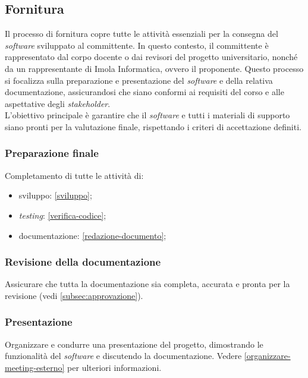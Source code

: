 \subsection{Fornitura}
Il processo di fornitura copre tutte le attività essenziali per la consegna del \textit{software} sviluppato al committente.
In questo contesto, il committente è rappresentato dal corpo docente o dai revisori del progetto universitario, nonché da un rappresentante di Imola Informatica, ovvero il proponente.
Questo processo si focalizza sulla preparazione e presentazione del \textit{software} e della relativa documentazione, assicurandosi che siano conformi ai requisiti del corso e alle aspettative degli \textit{stakeholder}. \\
L'obiettivo principale è garantire che il \textit{software} e tutti i materiali di supporto siano pronti per la valutazione finale, rispettando i criteri di accettazione definiti.


\subsubsection{Preparazione finale} 
Completamento di tutte le attività di:
\begin{itemize}
	\item sviluppo: \cref{sviluppo};
	\item \textit{testing}: \cref{verifica-codice};
	\item documentazione: \cref{redazione-documento};
\end{itemize}


\subsubsection{Revisione della documentazione} 
Assicurare che tutta la documentazione sia completa, accurata e pronta per la revisione (vedi \cref{subsec:approvazione}).

\subsubsection{Presentazione} 
Organizzare e condurre una presentazione del progetto, dimostrando le 
funzionalità del \textit{software} e discutendo la documentazione.
Vedere \cref{organizzare-meeting-esterno} per ulteriori informazioni.


